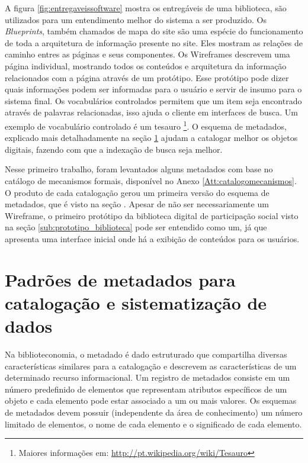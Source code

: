 A figura \ref{fig:entregaveissoftware} mostra os entregáveis de uma biblioteca, são utilizados para um entendimento melhor do sistema a ser produzido. Os \textit{Blueprints}, também chamados de mapa do site são uma espécie do funcionamento de toda a arquitetura de informação presente no site. Eles mostram as relações de caminho entres as páginas e seus componentes. Os Wireframes descrevem uma página individual, mostrando todos os conteúdos e arquitetura da informação relacionados com a página através de um protótipo. Esse protótipo pode dizer quais informações podem ser informadas para o usuário e servir de insumo para o sistema final. Os vocabulários controlados permitem que um item seja encontrado através de palavras relacionadas, isso ajuda o cliente em interfaces de busca. Um exemplo de vocabulário controlado é um tesauro \footnote{Maiores informações em: \url{http://pt.wikipedia.org/wiki/Tesauro}}. O esquema de metadados, explicado mais detalhadamente na seção \ref{sec:padraometadado} ajudam a catalogar melhor os objetos digitais, fazendo com que a indexação de busca seja melhor.

Nesse primeiro trabalho, foram levantados alguns metadados com base no catálogo de mecanismos formais, disponível no Anexo \ref{Att:catalogomecanismos}. O produto de cada catalogação gerou um primeira versão do esquema de metadados, que é visto na seção . Apesar de não ser necessariamente um Wireframe, o primeiro protótipo da biblioteca digital de participação social visto na seção \ref{sub:prototipo_biblioteca} pode ser entendido como um, já que apresenta uma interface inicial onde há a exibição de conteúdos para os usuários.

\section{Padrões de metadados para catalogação e sistematização de dados}
\label{sec:padraometadado}

Na biblioteconomia, o metadado é dado estruturado que compartilha diversas características similares para a catalogação e descrevem as características de um determinado recurso informacional. Um registro de metadados consiste em um número predefinido de elementos que representam atributos específicos de um objeto e cada elemento pode estar associado a um ou mais valores. Os esquemas de metadados devem possuir (independente da área de conhecimento) um número limitado de elementos, o nome de cada elemento e o significado de cada elemento.

